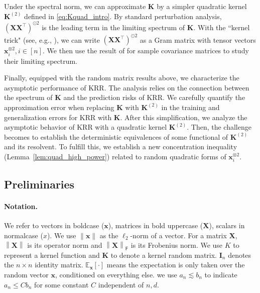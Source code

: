 \documentclass[twoside,11pt]{article}
\newcommand{\norm}[1]{\left\|#1\right\|}
\def\bI{{\mathbf I}}
\def\bK{{\boldsymbol K}}
\def\bX{{\boldsymbol X}}
\def\bx{{\boldsymbol x}}
\renewcommand{\bK}{\boldsymbol{K}}
\newcommand{\1}{\mathbf{1}}
\def\msf{\mathsf}
\def\tran{^\top}
\begin{document}
Under the spectral norm, we can approximate $\bK$ by a simpler quadratic kernel $\bK^{(2)}$ defined in \eqref{eq:Kquad_intro}. By standard perturbation analysis,  $(\bX\bX\tran)^{\odot 2}$ is the leading term in the limiting spectrum of $\bK$. With the ``kernel trick" (see, e.g., \cite[Exercise 3.7.4]{vershynin2010introduction}), we can write $(\bX\bX\tran)^{\odot 2}$ as a Gram matrix with tensor vectors $\bx_i^{\otimes 2}, i\in [n]$.  We then use the result of \cite{bai2008large} for sample covariance matrices to study their limiting spectrum. 



Finally, equipped with the random matrix results above, we characterize the asymptotic performance of KRR. The analysis relies on the connection between the spectrum of $\bK$ and the prediction risks of KRR. We carefully quantify the approximation error when replacing $\bK$ with $\bK^{(2)}$ in the training and generalization errors for KRR with $\bK$. After this simplification, we analyze the asymptotic behavior of KRR with a quadratic kernel $\bK^{(2)}$. Then, the challenge becomes to establish the deterministic equivalences of some functional of $\bK^{(2)}$ and its resolvent. To fulfill this, we establish a new concentration inequality (Lemma~\ref{lem:quad_high_power}) related to random quadratic forms of $\bx_i^{\otimes 2}$. 




\subsection{Preliminaries} \label{sec:prelim}
 \paragraph{Notation.} We refer to vectors in boldcase ($\bx$), matrices in bold uppercase ($\bX$), scalars in normalcase ($x$). We use $\|\bx\|$ as the $\ell_2$-norm of a vector. For a matrix $\bX$, $\norm{\bX}$ is its operator norm and $\norm{\bX}_{\msf F}$ is its Frobenius norm. We use $K$ to represent a kernel function and $\bK$ to denote a kernel random matrix. $\bI_n$ denotes the $n\times n$ identity matrix.  $\mathbb E_{\bx}[\cdot]$ means the expectation is only taken over the random vector $\bx$, conditioned on everything else.  we use $a_n\lesssim b_n$ to indicate $a_n\leq Cb_n$ for some  constant $C$ independent of $n,d$.
 
\end{document}
